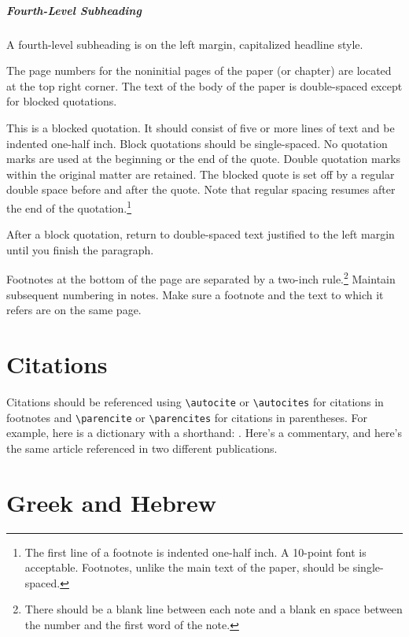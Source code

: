 \documentclass[letterpaper,12pt,oneside,openany]{book}
\begin{document}
\subparagraph{Fourth-Level Subheading}

A fourth-level subheading is on the left margin, capitalized headline style.

The page numbers for the noninitial pages of the paper (or chapter) are
located at the top right corner. The text of the body of the paper is
double-spaced except for blocked
quotations.
\begin{quoting}
  This is a blocked quotation. It should consist of five or more lines of text
  and be indented one-half inch. Block quotations should be single-spaced. No
  quotation marks are used at the beginning or the end of the quote. Double
  quotation marks within the original matter are retained. The blocked quote
  is set off by a regular double space before and after the quote. Note that
  regular spacing resumes after the end of the quotation.\footnote{The first
  line of a footnote is indented one-half inch. A 10-point font is acceptable.
  Footnotes, unlike the main text of the paper, should be single-spaced.}
\end{quoting}
After a block quotation, return to double-spaced text justified to the left
margin until you finish the paragraph.

%
Footnotes at the bottom of the page are separated by a two-inch
rule.\footnote{There should be a blank line between each note and a blank en
space between the number and the first word of the note.} Maintain subsequent
numbering in notes. Make sure a footnote and the text to which it refers are
on the same page.

\section{Citations}

%
Citations should be referenced using \verb+\autocite+ or \verb+\autocites+ for
citations in footnotes and \verb+\parencite+ or \verb+\parencites+ for
citations in parentheses. For example, here is a dictionary with a shorthand:
\parencite{NIDNTT}. Here's a commentary,\autocite{dahood:1965-1970} and here's
the same article referenced in two different
publications.\autocites{freedman:1977,freedman:1980}

\section{Greek and Hebrew}
\end{document}
